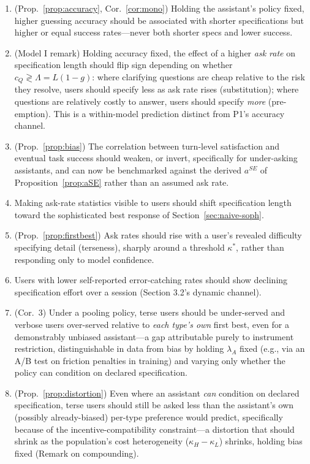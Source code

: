 \documentclass[11pt]{article}
\begin{document}
\begin{enumerate}[leftmargin=*]
\item[\textbf{P1}] (Prop.~\ref{prop:accuracy}, Cor.~\ref{cor:mono}) Holding the
assistant's policy fixed, higher guessing accuracy should be associated with
shorter specifications but higher or equal success rates---never both shorter
specs and lower success.
\item[\textbf{P1$'$}] (Model I remark) Holding accuracy fixed, the effect of a
higher \emph{ask rate} on specification length should flip sign depending on
whether $c_Q \gtrless \Lambda=L(1-g)$: where clarifying questions are cheap
relative to the risk they resolve, users should specify less as ask rate rises
(substitution); where questions are relatively costly to answer, users should
specify \emph{more} (pre-emption). This is a within-model prediction distinct
from P1's accuracy channel.
\item[\textbf{P2}] (Prop.~\ref{prop:bias}) The correlation between turn-level
satisfaction and eventual task success should weaken, or invert, specifically for
under-asking assistants, and can now be benchmarked against the derived $a^{SE}$
of Proposition~\ref{prop:aSE} rather than an assumed ask rate.
\item[\textbf{P3}] Making ask-rate statistics visible to users should shift
specification length toward the sophisticated best response of
Section~\ref{sec:naive-soph}.
\item[\textbf{P4}] (Prop.~\ref{prop:firstbest}) Ask rates should rise with a
user's revealed difficulty specifying detail (terseness), sharply around a
threshold $\kappa^*$, rather than responding only to model confidence.
\item[\textbf{P5}] Users with lower self-reported error-catching rates should show
declining specification effort over a session (Section 3.2's dynamic channel).
\item[\textbf{P6}] (Cor.~3) Under a pooling policy, terse users should be
under-served and verbose users over-served relative to \emph{each type's own}
first best, even for a demonstrably unbiased assistant---a gap attributable
purely to instrument restriction, distinguishable in data from bias by holding
$\lambda_A$ fixed (e.g., via an A/B test on friction penalties in training) and
varying only whether the policy can condition on declared specification.
\item[\textbf{P7}] (Prop.~\ref{prop:distortion}) Even where an assistant \emph{can}
condition on declared specification, terse users should still be asked less than
the assistant's own (possibly already-biased) per-type preference would predict,
specifically because of the incentive-compatibility constraint---a distortion
that should shrink as the population's cost heterogeneity ($\kappa_H-\kappa_L$)
shrinks, holding bias fixed (Remark on compounding).
\end{enumerate}
\end{document}
